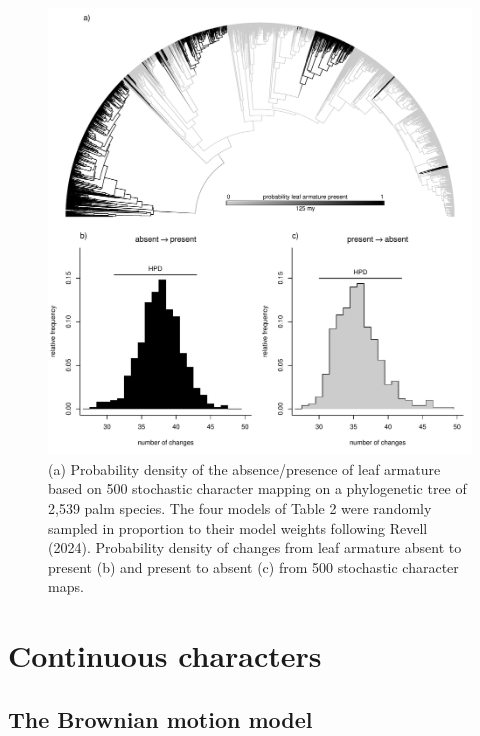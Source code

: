 \documentclass{article}
\begin{document}
\begin{figure}
\includegraphics[width=1\linewidth]{Revell.AncestralReconstruction_files/figure-latex/fig8-1} \caption{(a) Probability density of the absence/presence of leaf armature based on 500 stochastic character mapping on a phylogenetic tree of 2,539 palm species. The four models of Table 2 were randomly sampled in proportion to their model weights following Revell (2024). Probability density of changes from leaf armature absent to present (b) and present to absent (c) from 500 stochastic character maps.}\label{fig:fig8}
\end{figure}

\section{Continuous characters}\label{continuous-characters}

\subsection{The Brownian motion model}\label{the-brownian-motion-model}
\end{document}
